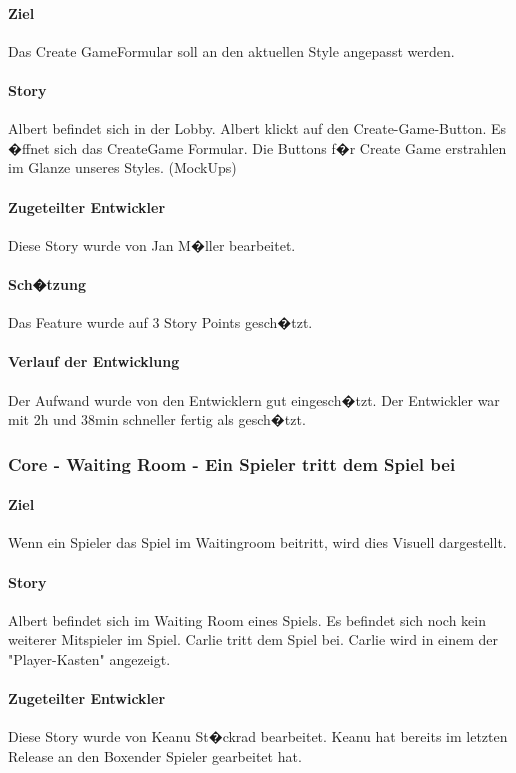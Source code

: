 \documentclass[12pt, titlepage]{scrartcl}
\begin{document}
			\paragraph{Ziel} Das \glqq Create Game\grqq Formular soll an den aktuellen Style angepasst werden.
			\paragraph{Story} Albert befindet sich in der Lobby. Albert klickt auf den Create-Game-Button. Es �ffnet sich das CreateGame Formular. Die Buttons f�r Create Game erstrahlen im Glanze unseres Styles. (MockUps)
			\paragraph{Zugeteilter Entwickler} Diese Story wurde von Jan M�ller bearbeitet.
			\paragraph{Sch�tzung}
			Das Feature wurde auf 3 Story Points gesch�tzt.
			\paragraph{Verlauf der Entwicklung} 
			Der Aufwand wurde von den Entwicklern gut eingesch�tzt. Der Entwickler war mit 2h und 38min schneller fertig als gesch�tzt. 
			
			\subsubsection{Core - Waiting Room - Ein Spieler tritt dem Spiel bei}
			\paragraph{Ziel} Wenn ein Spieler das Spiel im Waitingroom beitritt, wird dies Visuell dargestellt.
			\paragraph{Story} Albert befindet sich im Waiting Room eines Spiels. Es befindet sich noch kein weiterer Mitspieler im Spiel. Carlie tritt dem Spiel bei. Carlie wird in einem der "Player-Kasten" angezeigt.
			\paragraph{Zugeteilter Entwickler} Diese Story wurde von Keanu St�ckrad bearbeitet. Keanu hat bereits im letzten Release an den \glqq Boxen\grqq der Spieler gearbeitet hat.
\end{document}
